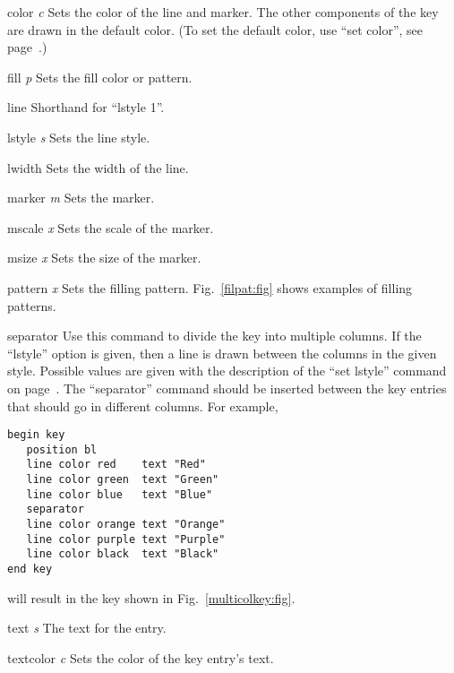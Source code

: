 \begin{commanddescription}

\item[{\sf color} {\it  c}]
Sets the color of the line and marker. The other components of the key are drawn in the default color. (To set the default color, use ``set color'', see page~\pageref{scol:cmd}.)

\item[{\sf fill} {\it p}]
Sets the fill color or pattern.

\item[{\sf line}]
Shorthand for ``lstyle 1''.

\item[{\sf lstyle} {\it s}]
Sets the line style.

\item[{\sf lwidth}]
Sets the width of the line.

\item[{\sf marker} {\it m}]
Sets the marker.

\item[{\sf mscale} {\it x}]
Sets the scale of the marker.

\item[{\sf msize} {\it x}]
Sets the size of the marker.

\item[{\sf pattern} {\it x}]
Sets the filling pattern. Fig.~\ref{filpat:fig} shows examples of filling patterns.

\item[{\sf separator} {\sf [lstyle {\it s}]} ]
Use this command to divide the key into multiple columns. If the ``lstyle'' option is given, then a line is drawn between the columns in the given style. Possible values are given with the description of the ``set lstyle'' command on page~\pageref{lstyle:cmd}. The ``separator'' command should be inserted between the key entries that should go in different columns. For example,
\vspace{3mm}
\preglecode{}
\begin{Verbatim}
begin key
   position bl
   line color red    text "Red"
   line color green  text "Green" 
   line color blue   text "Blue"
   separator
   line color orange text "Orange"
   line color purple text "Purple"
   line color black  text "Black"
end key
\end{Verbatim}
\postglecode{}
\vspace{3mm}
\noindent{}will result in the key shown in Fig.~\ref{multicolkey:fig}.

\item[{\sf text} {\it s}]
The text for the entry.

\item[{\sf textcolor} {\it  c}]
Sets the color of the key entry's text.

\end{commanddescription}


